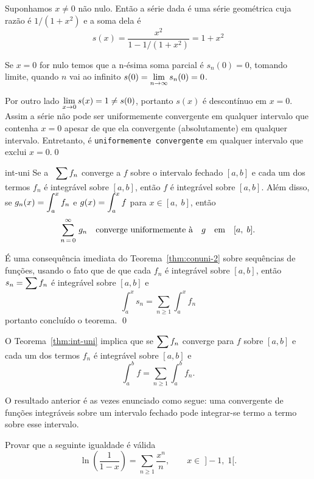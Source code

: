 \solo Suponhamos $x \neq 0$ não nulo. Então a série dada é uma série
geométrica cuja razão é $1/(1+x^2)$ e a soma dela é
\begin{equation*}
    s(x)=\frac{x^2}{1-1/(1+x^2)}=1+x^2
\end{equation*}

Se $x = 0$ for nulo temos que a n-ésima soma parcial é $s_n(0)=0$,
tomando limite, quando $n$ vai ao infinito
$\displaystyle{s(0)=\lim_{n\to\infty} s_n(0)=0}$.

Por outro lado $\displaystyle{\lim_{x\to 0}s(x)=1\neq s(0)}$, portanto
$s(x)$ é descontínuo em $x=0$. Assim a série não pode ser
uniformemente convergente em qualquer intervalo que contenha $x=0$
apesar de que ela convergente (absolutamente) em qualquer
intervalo. Entretanto, é \texttt{uniformemente convergente} em
qualquer intervalo que exclui $x=0$.\qed


\begin{theoc}{}{int-uni}
Se a \ser\ $\displaystyle{\sum f_n}$ converge \unif a $f$ sobre o intervalo
fechado $[a, b]$ e cada um dos termos $f_n$ é integrável sobre
$[a,b]$, então $f$ é integrável sobre $[a, b]$. Além disso, se
$\displaystyle{g_n(x)=\int_a^xf_n }$ e $\displaystyle{g(x)=\int_a^xf}$  para $x\in
[a,\; b]$, então 
\begin{equation*}
\sum_{n\, =\, 0}^{\infty}\,g_{n} \quad \text{converge \mbox{uniformemente }à}\quad g \quad \text{em} \quad  [a, \;b].
\end{equation*}
\end{theoc}

\prova É uma consequência imediata do Teorema~\ref{thm:conuni-2} sobre
sequências de funções, usando o fato que de que cada $f_n$ é
integrável sobre $[a,b]$, então $\displaystyle{s_n=\sum f_n}$ é integrável
sobre $[a,b]$  e 
\begin{equation*}
\int_a^x s_n=\sum_{n\ge 1}\int_a^x f_n
\end{equation*}
portanto concluído o teorema. \hfill \qed

O Teorema~\ref{thm:int-uni} implica que se $\displaystyle{\sum f_n}$ converge
\unif para $f$ sobre $[a,b]$ e cada um dos termos $f_n$ é
integrável sobre $[a,b]$ e
\begin{equation*}
    \int_a^bf=\sum_{n\ge 1}\int_a^bf_n.
\end{equation*}

O resultado anterior é as vezes enunciado como segue: uma \ser
\unif convergente de funções integráveis sobre um intervalo fechado
pode integrar-se termo a termo sobre esse intervalo.

\begin{exer}
Provar que a seguinte igualdade é válida
\begin{equation*}
\ln \left(\frac{1}{1-x}\right)=\sum_{n\ge 1}\frac{x^n}{n},\qquad x\in\; ]-1, \; 1[.
\end{equation*}
\end{exer}

